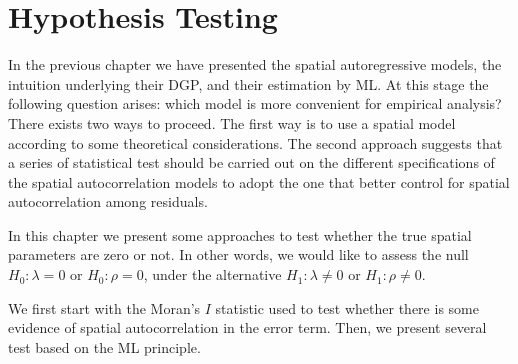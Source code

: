 \documentclass[english,12pt]{book}\usepackage[]{graphicx}\usepackage[]{xcolor}
\begin{document}
% 
% 
% 
% 
% 

	




\chapter{Hypothesis Testing}

In the previous chapter we have presented the spatial autoregressive models, the intuition underlying their DGP, and their estimation by ML. At this stage the following question arises: which model is more convenient for empirical analysis? There exists two ways to proceed. The first way is to use a spatial model according to some theoretical considerations. The second approach suggests that a series of statistical test should be carried out on the different specifications of the spatial autocorrelation models to adopt the one that better control for spatial autocorrelation among residuals. 

In this chapter we present some approaches to test whether the true spatial parameters are zero or not. In other words, we would like to assess the null $H_0:\lambda = 0$ or $H_0: \rho = 0$, under the alternative $H_1: \lambda \neq 0$ or $H_1:\rho \neq 0$.

We first start with the Moran's $I$ statistic used to test whether there is some evidence of spatial autocorrelation in the error term. Then, we present several test based on the ML principle. 
\end{document}

